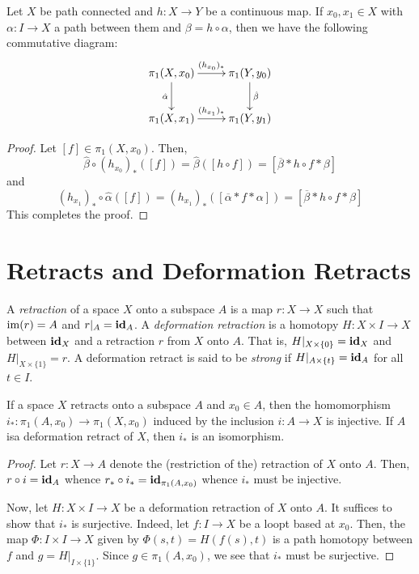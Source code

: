 \begin{proposition}
    Let $X$ be path connected and $h: X\to Y$ be a continuous map. If $x_0,x_1\in X$ with $\alpha: I\to X$ a path between them and $\beta = h\circ\alpha$, then we have the following commutative diagram: 
    \begin{equation*}
    \xymatrix {
        \pi_1(X,x_0)\ar[r]^-{(h_{x_0})_*}\ar[d]_{\hat\alpha} & \pi_1(Y,y_0)\ar[d]^{\hat\beta}\\
        \pi_1(X,x_1)\ar[r]^-{(h_{x_1})_*} & \pi_1(Y,y_1)
    }
    \end{equation*}
\end{proposition}
\begin{proof}
    Let $[f]\in\pi_1(X,x_0)$. Then, 
    \begin{equation*}
        \hat\beta\circ(h_{x_0})_*([f]) = \hat\beta([h\circ f]) = [\overline\beta * h\circ f * \beta]
    \end{equation*}
    and 
    \begin{equation*}
        (h_{x_1})_*\circ\hat\alpha([f]) = (h_{x_1})_*([\overline\alpha * f * \alpha]) = [\overline\beta * h\circ f * \beta]
    \end{equation*}
    This completes the proof.
\end{proof}

\section{Retracts and Deformation Retracts}

\begin{definition}
    A \emph{retraction} of a space $X$ onto a subspace $A$ is a map $r: X\to X$ such that $\operatorname{im}(r) = A$ and $r|_A = \mathbf{id}_A$. A \emph{deformation retraction} is a homotopy $H: X\times I\to X$ between $\mathbf{id}_X$ and a retraction $r$ from $X$ onto $A$. That is, $H|_{X\times\{0\}} = \mathbf{id}_X$ and $H|_{X\times\{1\}} = r$. A deformation retract is said to be \emph{strong} if $H|_{A\times\{t\}} = \mathbf{id}_A$ for all $t\in I$.
\end{definition}

\begin{proposition}
    If a space $X$ retracts onto a subspace $A$ and $x_0\in A$, then the homomorphism $i_\ast:\pi_1(A,x_0)\to\pi_1(X,x_0)$ induced by the inclusion $i: A\to X$ is injective. If $A$ isa  deformation retract of $X$, then $i_\ast$ is an isomorphism.
\end{proposition}
\begin{proof}
    Let $r: X\to A$ denote the (restriction of the) retraction of $X$ onto $A$. Then, $r\circ i = \mathbf{id}_A$ whence $r_\ast\circ i_\ast = \mathbf{id}_{\pi_1(A,x_0)}$ whence $i_\ast$ must be injective. 

    Now, let $H: X\times I\to X$ be a deformation retraction of $X$ onto $A$. It suffices to show that $i_\ast$ is surjective. Indeed, let $f: I\to X$ be a loopt based at $x_0$. Then, the map $\Phi: I\times I\to X$ given by $\Phi(s,t) = H(f(s), t)$ is a path homotopy between $f$ and $g = H|_{I\times\{1\}}$. Since $g\in\pi_1(A, x_0)$, we see that $i_*$ must be surjective.
\end{proof}

